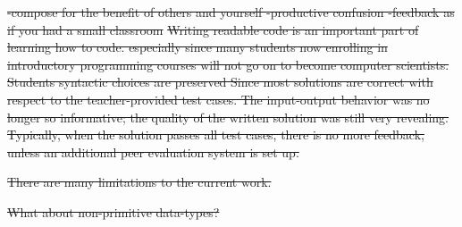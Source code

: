 \documentclass[12pt,twoside]{mitthesis}
\providecommand{\DIFdeltex}[1]{{\protect\color{red}\sout{#1}}}                      %
\providecommand{\DIFdel}[1]{\texorpdfstring{\DIFdeltex{#1}}{}} %
\begin{document}
{{{{{{{{{{%
\DIFdel{-compose for the benefit of others and yourself
-productive confusion
-feedback as if you had a small classroom
}%
\DIFdel{Writing readable code is an important part of learning how to code. especially since many students now enrolling in introductory programming courses will not go on to become computer scientists. Students syntactic choices are preserved
Since most solutions are correct with respect to the teacher-provided test cases. The input-output behavior was no longer so informative; the quality of the written solution was still very revealing. Typically, when the solution passes all test cases, there is no more feedback, unless an additional peer evaluation system is set up.
}%


\DIFdel{There are many limitations to the current work. 
}%

\DIFdel{What about non-primitive data-types?
}%






}}}}}}}}}}
\end{document}
